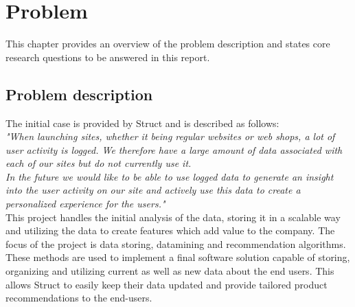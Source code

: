 
\chapter{Problem} %

\label{Problem} %

This chapter provides an overview of the problem description and states core research questions to be answered in this report.

\section{Problem description}

The initial case is provided by \gls{Struct} and is described as follows: \\

\textit{"When launching sites, whether it being regular websites or web shops, a lot of user activity is logged. We therefore have a large amount of data associated with each of our sites but do not currently use it.} \\
\textit{In the future we would like to be able to use logged data to generate an insight into the user activity on our site and actively use this data to create a personalized experience for the users."} \\

This project handles the initial analysis of the data, storing it in a scalable way and utilizing the data to create features which add value to the company. The focus of the project is data storing, \gls{datamining} and recommendation algorithms. These methods are used to implement a final software solution capable of storing, organizing and utilizing current as well as new data about the end users. This allows \gls{Struct} to easily keep their data updated and provide tailored product recommendations to the end-users.

